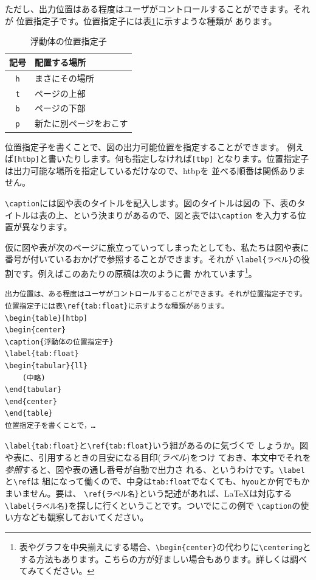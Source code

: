 ただし、出力位置はある程度はユーザがコントロールすることができます。それが
位置指定子です。位置指定子には表\ref{tab:float}に示すような種類が
あります。
\begin{table}[htbp]
\begin{center}
\caption{浮動体の位置指定子}
\label{tab:float}
\begin{tabular}{cl}
\hline
記号     & 配置する場所           \\
\hline
\verb+h+ & まさにその場所         \\
\verb+t+ & ページの上部           \\
\verb+b+ & ページの下部           \\
\verb+p+ & 新たに別ページをおこす \\
\hline
\end{tabular}
\end{center}
\end{table}
位置指定子を書くことで、図の出力可能位置を指定することができます。
例えば\verb+[htbp]+と書いたりします。何も指定しなければ\verb+[tbp]+
となります。位置指定子は出力可能な場所を指定しているだけなので、htbpを
並べる順番は関係ありません。

\verb+\caption+には図や表のタイトルを記入します。図のタイトルは図の
下、表のタイトルは表の上、という決まりがあるので、図と表では\verb+\caption+
を入力する位置が異なります。

仮に図や表が次のページに旅立っていってしまったとしても、私たちは図や表に
番号が付いているおかげで参照することができます。それが
\verb+\label{ラベル}+の役割です。例えばこのあたりの原稿は次のように書
かれています\footnote{表やグラフを中央揃えにする場合、\verb+\begin{center}+の代わりに\verb+\centering+とする方法もあります。こちらの方が好ましい場合もあります。詳しくは調べてみてください。}。
\begin{screen}
\begin{verbatim}
出力位置は、ある程度はユーザがコントロールすることができます。それが位置指定子です。
位置指定子には表\ref{tab:float}に示すような種類があります。
\begin{table}[htbp]
\begin{center}
\caption{浮動体の位置指定子}
\label{tab:float}
\begin{tabular}{ll}
    (中略)
\end{tabular}
\end{center}
\end{table}
位置指定子を書くことで，…
\end{verbatim}
\end{screen}
\verb+\label{tab:float}+と\verb+\ref{tab:float}+いう組があるのに気づくで
しょうか。図や表に、引用するときの目安になる目印(\emph{ラベル})をつけ
ておき、本文中でそれを\emph{参照}すると、図や表の通し番号が自動で出力さ
れる、というわけです。\verb+\label+と\verb+\ref+は
組になって働くので、中身は\verb+tab:float+でなくても、\verb+hyou+とか何でもかまいません。要は、
\verb+\ref{ラベル名}+という記述があれば、{\LaTeX}は対応する
\verb+\label{ラベル名}+を探しに行くということです。ついでにこの例で
\verb+\caption+の使い方なども観察しておいてください。

